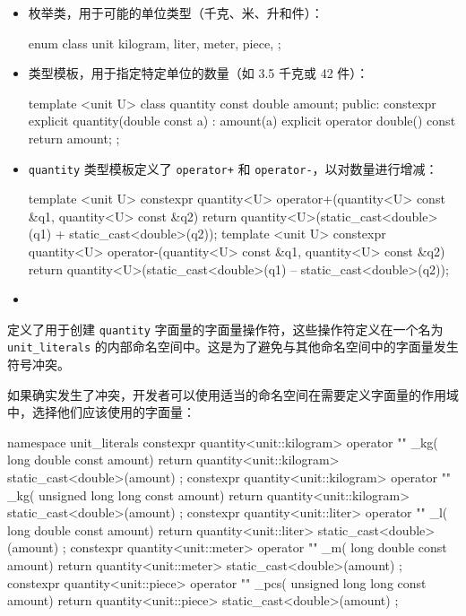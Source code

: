 \begin{itemize}
\item
枚举类，用于可能的单位类型（千克、米、升和件）：

\begin{cpp}
enum class unit { kilogram, liter, meter, piece, };
\end{cpp}

\item
类型模板，用于指定特定单位的数量（如 3.5 千克或 42 件）：

\begin{cpp}
template <unit U>
class quantity
{
    const double amount;
    public:
    constexpr explicit quantity(double const a) : amount(a)
    {}
    explicit operator double() const { return amount; }
};
\end{cpp}

\item
\verb|quantity| 类型模板定义了 \verb|operator+| 和 \verb|operator-|，以对数量进行增减：

\begin{cpp}
template <unit U>
constexpr quantity<U> operator+(quantity<U> const &q1,
                                quantity<U> const &q2)
{
    return quantity<U>(static_cast<double>(q1) +
    static_cast<double>(q2));
}
template <unit U>
constexpr quantity<U> operator-(quantity<U> const &q1,
                                quantity<U> const &q2)
{
    return quantity<U>(static_cast<double>(q1) –
    static_cast<double>(q2));
}
\end{cpp}

\item

\end{itemize}
定义了用于创建 \verb|quantity| 字面量的字面量操作符，这些操作符定义在一个名为 \verb|unit_literals| 的内部命名空间中。这是为了避免与其他命名空间中的字面量发生符号冲突。

如果确实发生了冲突，开发者可以使用适当的命名空间在需要定义字面量的作用域中，选择他们应该使用的字面量：

\begin{cpp}
namespace unit_literals
{
    constexpr quantity<unit::kilogram> operator "" _kg(
    long double const amount)
    {
        return quantity<unit::kilogram> { static_cast<double>(amount) };
    }
    constexpr quantity<unit::kilogram> operator "" _kg(
    unsigned long long const amount)
    {
        return quantity<unit::kilogram> { static_cast<double>(amount) };
    }
    constexpr quantity<unit::liter> operator "" _l(
    long double const amount)
    {
        return quantity<unit::liter> { static_cast<double>(amount) };
    }
    constexpr quantity<unit::meter> operator "" _m(
    long double const amount)
    {
        return quantity<unit::meter> { static_cast<double>(amount) };
    }
    constexpr quantity<unit::piece> operator "" _pcs(
    unsigned long long const amount)
    {
        return quantity<unit::piece> { static_cast<double>(amount) };
    }
}
\end{cpp}

